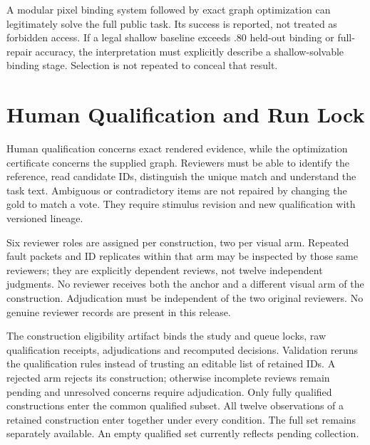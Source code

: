 \documentclass[10pt,twocolumn,letterpaper]{article}
\begin{document}
A modular pixel binding system followed by exact graph optimization
can legitimately solve the full public task. Its success is reported,
not treated as forbidden access. If a legal shallow baseline exceeds
.80 held-out binding or full-repair accuracy, the interpretation must
explicitly describe a shallow-solvable binding stage. Selection is
not repeated to conceal that result.

\begin{table}[t]
\centering\small
\caption{Actual deterministic baseline audit. These are local
algorithm outcomes; they are separate from the blank learned-model
tables. Full per-condition denominators and configurations are
retained in the versioned baseline report.}
\label{tab:baselines}

\end{table}


\section{Human Qualification and Run Lock}
Human qualification concerns exact rendered evidence, while the
optimization certificate concerns the supplied graph.
Reviewers must be able to identify the reference, read candidate
IDs, distinguish the unique match and understand the task text.
Ambiguous or contradictory items are not repaired by changing
the gold to match a vote. They require stimulus revision and new
qualification with versioned lineage.

Six reviewer roles are assigned per construction, two per visual
arm. Repeated fault packets and ID replicates within that arm may
be inspected by those same reviewers; they are explicitly dependent
reviews, not twelve independent judgments. No reviewer receives
both the anchor and a different visual arm of the construction.
Adjudication must be independent of the two original reviewers.
No genuine reviewer records are present in this release.

The construction eligibility artifact binds the study and queue
locks, raw qualification receipts, adjudications and recomputed
decisions. Validation reruns the qualification rules instead of
trusting an editable list of retained IDs. A rejected arm rejects
its construction; otherwise incomplete reviews remain pending and
unresolved concerns require adjudication. Only fully qualified
constructions enter the common qualified subset.
All twelve observations of a retained construction enter together
under every condition. The full set remains separately available.
An empty qualified set currently reflects pending collection.
\end{document}
